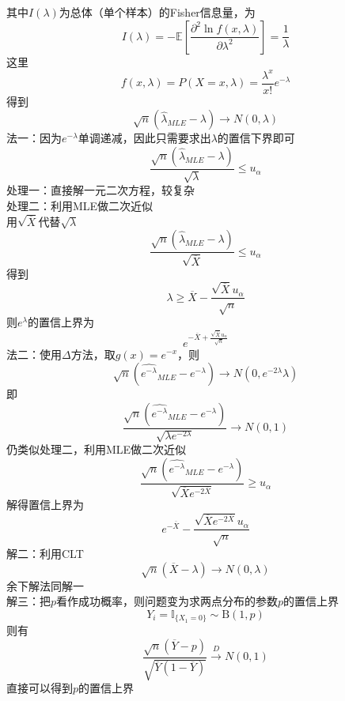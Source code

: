 \documentclass[UTF8]{ctexart}
\begin{document}
其中$I(\lambda)$为总体（单个样本）的Fisher信息量，为
\[
I(\lambda)=-\mathbb{E}\left[\frac{\partial^2 \ln f(x,\lambda)}{\partial \lambda^2} \right] =\frac{1}{\lambda}
\]
这里
\[
f(x,\lambda)=P(X=x,\lambda)=\frac{\lambda^x}{x!}e^{-\lambda}
\]
得到
\[
\sqrt{n}\left(\hat{\lambda}_{MLE}-\lambda \right) \rightarrow N\left(0,\lambda \right) 
\]
法一：因为$e^{-\lambda}$单调递减，因此只需要求出$\lambda$的置信下界即可
\[
\frac{\sqrt{n}\left(\hat{\lambda}_{MLE}-\lambda \right)}{\sqrt{\lambda}}\le u_{\alpha}
\]
处理一：直接解一元二次方程，较复杂\\
处理二：利用MLE做二次近似\\
用$\sqrt{\overline{X}}$代替$\sqrt{\lambda}$
\[
\frac{\sqrt{n}\left(\hat{\lambda}_{MLE}-\lambda \right)}{\sqrt{\overline{X}}}\le u_{\alpha}
\]
得到
\[
\lambda \ge \overline{X}-\frac{\sqrt{\overline{X}}u_{\alpha}}{\sqrt{n}}
\]
则$e^{\lambda}$的置信上界为
\[
e^{-\overline{X}+\frac{\sqrt{\overline{X}}u_{\alpha}}{\sqrt{n}}}
\]
法二：使用$\Delta$方法，取$g(x)=e^{-x}$，则
\[
\sqrt{n}\left(\hat{e^{-\lambda}}_{MLE}-e^{-\lambda} \right) \rightarrow N\left(0,e^{-2\lambda}\lambda \right) 
\]
即
\[
\frac{\sqrt{n}\left(\hat{e^{-\lambda}}_{MLE}-e^{-\lambda} \right)}{\sqrt{\lambda e^{-2\lambda}}}\rightarrow N(0,1)
\]
仍类似处理二，利用MLE做二次近似
\[
\frac{\sqrt{n}\left(\hat{e^{-\lambda}}_{MLE}-e^{-\lambda} \right)}{\sqrt{\overline{X} e^{-2\overline{X}}}}\ge u_\alpha
\]
解得置信上界为
\[
 e^{-\overline{X}}-\frac{\sqrt{\overline{X} e^{-2 \overline{X}}} u_\alpha}{\sqrt{n}}
\]
解二：利用CLT
\[
\sqrt{n}\left(\overline{X}-\lambda \right)\rightarrow N(0,\lambda) 
\]
余下解法同解一\\
解三：把$p$看作成功概率，则问题变为求两点分布的参数$p$的置信上界
\[
Y_i=\mathbb{I}_{\{X_1=0\}}\sim \mathrm{B}(1,p)
\]
则有
\[
\frac{\sqrt{n}(\overline{Y}-p)}{\sqrt{\overline{Y}(1-\overline{Y})}} \xrightarrow{D} N(0,1)
\]
直接可以得到$p$的置信上界\\
\end{document}
